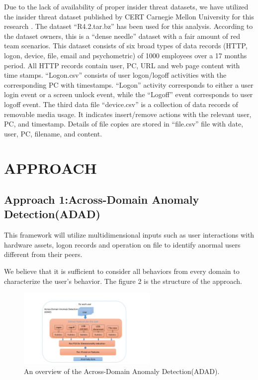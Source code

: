 \documentclass[conference]{IEEEtran}
\begin{document}
Due to the lack of availability of proper insider threat datasets, we have utilized the insider threat
dataset published by CERT Carnegie Mellon University for this research \cite{b39}. The dataset “R4.2.tar.bz” has been used for this analysis. According to the dataset owners, this is a “dense needle” dataset with a fair amount of red team scenarios. This dataset consists of six broad types of data records (HTTP, logon, device, file, email and psychometric) of 1000 employees over a 17 months period. 
All HTTP records contain user, PC, URL and web page content with time stamps. “Logon.csv” consists of user logon/logoff activities with the corresponding PC with timestamps. “Logon” activity corresponds to either a user login event or a screen unlock event, while the “Logoff” event corresponds to user logoff event.  The third data file “device.csv” is a collection of data records of removable media usage. It indicates insert/remove actions with the relevant user, PC, and timestamp. Details of file copies are stored in “file.csv” file with date, user, PC, filename, and content.

\section{APPROACH}


\subsection{Approach 1:Across-Domain Anomaly Detection(ADAD)}\label{AA}

This framework will utilize multidimensional inputs such as user interactions with hardware
assets, logon records and operation on file to identify anormal users different from their peers.

We believe that it is sufficient to consider all behaviors from every domain to characterize the user's behavior. The figure 2 is the structure of the approach.


\begin{figure}[htb]
\centerline{\includegraphics[width = 0.6\textwidth]{figure/figure3.png}}
\caption{An overview of the Across-Domain Anomaly Detection(ADAD).}
\label{fig}
\end{figure}
\end{document}
